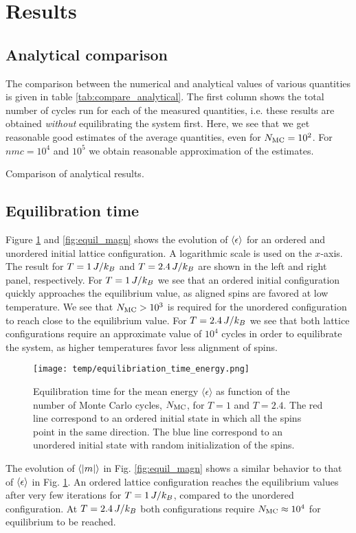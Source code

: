 \section{Results}\label{sec:results}
\subsection{Analytical comparison}\label{subsec_results:analytical}
The comparison between the numerical and analytical values of various quantities is given in table \ref{tab:compare_analytical}. The first column shows the total number of cycles run for each of the measured quantities, i.e. these results are obtained \textit{without} equilibrating the system first. Here, we see that we get reasonable good estimates of the average quantities, even for $N_\mathrm{MC}=10^2$. For $nmc=10^4$ and $10^5$ we obtain reasonable approximation of the estimates.  

\begin{table}[!ht]
    
    \caption{Comparison of analytical results. }
    \label{tab:compare_analytical}
\end{table}


\subsection{Equilibration time}\label{subsec_results:equilibriation_time}
Figure \ref{fig:equil_energy} and \ref{fig:equil_magn} shows the evolution of $\expval{\epsilon}$ for an ordered and unordered initial lattice configuration. A logarithmic scale is used on the $x$-axis. The result for $T=1\,J/k_B$ and $T=2.4\,J/k_B$ are shown in the left and right panel, respectively. For $T=1\,J/k_B$ we see that an ordered initial configuration quickly approaches the equilibrium value, as aligned spins are favored at low temperature. We see that $N_\mathrm{MC}>10^3$ is required for the unordered configuration to reach close to the equilibrium value. For $T=2.4\,J/k_B$ we see that both lattice configurations require an approximate value of $10^4$ cycles in order to equilibrate the system, as higher temperatures favor less alignment of spins.       
\begin{figure}[!ht]
    \texttt{[image: temp/equilibriation\_time\_energy.png]}
    \caption{Equilibration time for the mean energy $\langle \epsilon \rangle$ as function of the number of Monte Carlo cycles, $N_\mathrm{MC}$, for $T=1$ and $T=2.4$. The red line correspond to an ordered initial state in which all the spins point in the same direction. The blue line correspond to an unordered initial state with random initialization of the spins.}

    \label{fig:equil_energy}
\end{figure}
The evolution of $\expval{\abs{m}}$ in Fig. \ref{fig:equil_magn} shows a similar behavior to that of $\expval{\epsilon}$ in Fig. \ref{fig:equil_energy}. An ordered lattice configuration reaches the equilibrium values after very few iterations for $T=1\,J/k_B$, compared to the unordered configuration. At $T=2.4\,J/k_B$ both configurations require $N_\mathrm{MC}\approx10^4$ for equilibrium to be reached. 

